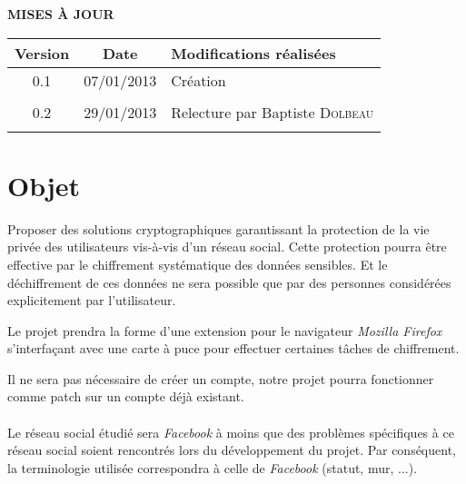 \documentclass[a4paper,11pt,french]{article}
\begin{document}
\makeFirstPage
\clearpage

\vspace*{1cm}
\begin{center}
\textbf{\huge{MISES À JOUR}}\\
\vspace*{3cm}
	\begin{tabularx}{16cm}{|c|c|X|}
	\hline
	\bfseries{Version} & \bfseries{Date} & \bfseries{Modifications réalisées}\\
	\hline
	0.1 & 07/01/2013 & Création\\
	\hline
	&&\\
	\hline
    0.2 & 29/01/2013 & Relecture par Baptiste \textsc{Dolbeau}\\
	\hline
	&&\\
	\hline
	\end{tabularx}
\end{center}

\clearpage
\tableofcontents
\clearpage

\section{Objet}
\renewcommand\labelitemi{\textbullet} %
\renewcommand\labelitemii{$\circ$} %
Proposer des solutions cryptographiques garantissant la protection de la vie 
privée des utilisateurs vis-à-vis d'un réseau social. Cette protection pourra
être effective par le chiffrement systématique des données sensibles. Et
le déchiffrement de ces données ne sera possible que par des personnes
considérées explicitement par l'utilisateur.


Le projet prendra la forme d'une extension pour le navigateur 
\emph{Mozilla Firefox}
s'interfaçant avec une carte à puce pour effectuer certaines tâches de 
chiffrement.

Il ne sera pas nécessaire de créer un compte, notre projet pourra fonctionner 
comme patch sur un compte déjà existant.

\paragraph{}
Le réseau social étudié sera \emph{Facebook} à moins que des problèmes spécifiques
à ce réseau social soient rencontrés lors du développement du projet.
Par conséquent, la terminologie utilisée correspondra à celle de \emph{Facebook} 
(statut, mur, ...).
\end{document}

